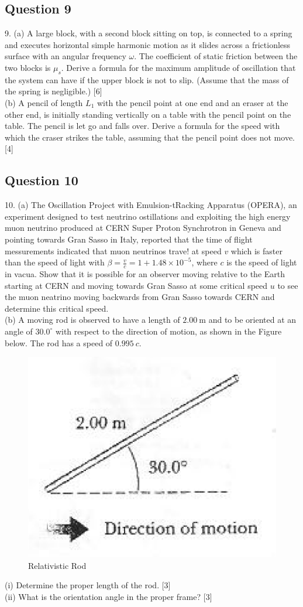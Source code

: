 \documentclass{article}
\begin{document}
\subsection{Question 9}
9. (a) A large block, with a second block sitting on top, is connected to a spring and executes horizontal simple harmonic motion as it slides across a frictionless surface with an angular frequency $\omega$. The coefficient of static friction between the two blocks is $\mu_{s}$. Derive a formula for the maximum amplitude of oscillation that the system can have if the upper block is not to slip. (Assume that the mass of the spring is negligible.) [6] \\
(b) A pencil of length $L_{1}$ with the pencil point at one end and an eraser at the other end, is initially standing vertically on a table with the pencil point on the table. The pencil is let go and falls over. Derive a formula for the speed with which the craser strikes the table, assuming that the pencil point does not move. [4]


\subsection{Question 10}
10. (a) The Oscillation Project with Emulsion-tRacking Apparatus (OPERA), an experiment designed to test neutrino ostillations and exploiting the high energy muon neutrino produced at CERN Super Proton Synchrotron in Geneva and pointing towards Gran Sasso in Italy, reported that the time of flight messurements indicated that muon neutrinos trave! at speed $v$ which is faster than the speed of light with $\beta=\frac{v}{c}=1+1.48 \times 10^{-5}$, where $c$ is the speed of light in vacua. Show that it is possible for an observer moving relative to the Earth starting at CERN and moving towards Gran Sasso at some critical speed $u$ to see the muon neatrino moving backwards from Gran Sasso towards CERN and determine this critical speed.\\
(b) A moving rod is observed to have a length of $2.00 \mathrm{~m}$ and to be oriented at an angle of $30.0^\circ$ with respect to the direction of motion, as shown in the Figure below. The rod has a speed of $0.995~c$.
\begin{figure}
	\centering
	\includegraphics[width=0.7\linewidth]{spho_book_TYS_images/2011q10.png}
	\caption{Relativistic Rod}
\end{figure}
(i) Determine the proper length of the rod. [3] \\
(ii) What is the orientation angle in the proper frame? [3] \\
\end{document}

